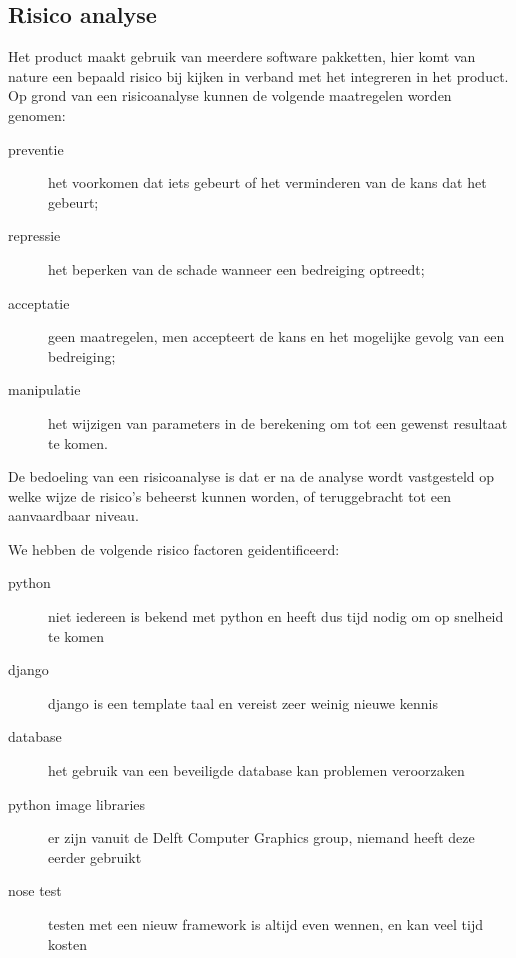 





\subsection{Risico analyse}

Het product maakt gebruik van meerdere software pakketten,
hier komt van nature een bepaald risico bij kijken in verband met het integreren in het product.
Op grond van een risicoanalyse kunnen de volgende maatregelen worden genomen:
\begin{description}
    \item[preventie] het voorkomen dat iets gebeurt of het verminderen van de kans dat het gebeurt;
    \item[repressie] het beperken van de schade wanneer een bedreiging optreedt;
    \item[acceptatie] geen maatregelen, men accepteert de kans en het mogelijke gevolg van een bedreiging;
    \item[manipulatie] het wijzigen van parameters in de berekening om tot een gewenst resultaat te komen.
\end{description}

De bedoeling van een risicoanalyse is dat er na de analyse wordt vastgesteld op welke wijze de risico's beheerst kunnen worden, of teruggebracht tot een aanvaardbaar niveau. \cite{wiki:risico_analyse}

We hebben de volgende risico factoren geidentificeerd:
\begin{description}
    \item[python] niet iedereen is bekend met python en heeft dus tijd nodig om op snelheid te komen
    \item[django] django is een template taal en vereist zeer weinig nieuwe kennis
    \item[database] het gebruik van een beveiligde database kan problemen veroorzaken
    \item[python image libraries] er zijn vanuit de Delft Computer Graphics group, niemand heeft deze eerder gebruikt
    \item[nose test] testen met een nieuw framework is altijd even wennen, en kan veel tijd kosten
\end{description}

